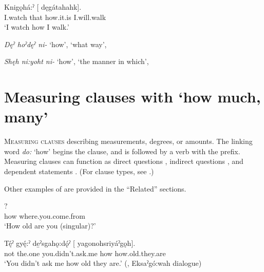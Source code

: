 \ea\label{ex:mannerclause2}
\gll Knigǫhá:ˀ [   dęgátahahk]. \\
I.watch that how.it.is I.will.walk\\
\glt ‘I watch how I walk.’
\z

\begin{CayugaRelated}
\item{}\textit{Dęˀ hoˀdęˀ ni-} ‘how’, ‘what way’, 

\item{}\textit{Shęh ni:yoht ni-} ‘how’, ‘the manner in which’, 
\end{CayugaRelated}


\largerpage
\section{Measuring clauses with  ‘how much, many’} \label{ch:Measuring clauses with [do: … ni-] ‘how much, many’}
\textsc{Measuring clauses} describing measurements, degrees, or amounts. The linking word \textit{do:} ‘how’ begins the clause, and is followed by a verb with the  \textsc{\partitive} prefix. Measuring clauses can function as direct questions , indirect questions , and dependent statements . (For clause types, see .)

Other examples of  are provided in the “Related” sections.

\ea\label{ex:howquesex} 
? \\
how where.you.come.from\\
\glt ‘How old are you (singular)?’
\z

\ea\label{ex:doexx}
\gll Tę́ˀ gyę́:ˀ de̱ˀsgahǫ:dǫ́ˀ [  yagonohsriyáˀgǫh]. \\
not the.one you.didn’t.ask.me how how.old.they.are\\
\glt ‘You didn’t ask me how old they are.’ (\cite[88]{mithun_watewayestanih_1984}, Eksaˀgó:wah dialogue)
\z

